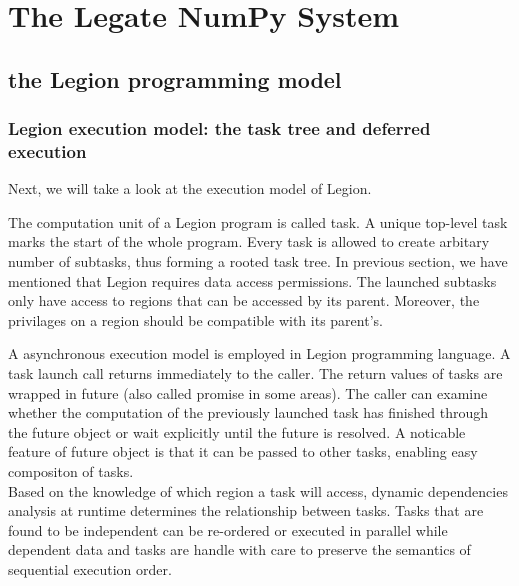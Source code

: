 \documentclass{article}
\newenvironment{newSec}[1]{
	\section{#1}
	\lhead{#1}
}{ \newpage }
\newenvironment{newSubsec}[1]{
	\subsection{#1}
}{}
\begin{document}
\begin{newSec}{The Legate NumPy System}
\begin{newSubsec}{the Legion programming model}
		\subsubsection{Legion execution model: the task tree and deferred execution}
		Next, we will take a look at the execution model of Legion.\par
		The computation unit of a Legion program is called task.
		A unique top-level task marks the start of the whole program.
		Every task is allowed to create arbitary number of subtasks, thus forming a rooted task tree.
		In previous section, we have mentioned that Legion requires data access permissions.
		The launched subtasks only have access to regions that can be accessed by its parent.
		Moreover, the privilages on a region should be compatible with its parent's.\par
		A asynchronous execution model is employed in Legion programming language.
		A task launch call returns immediately to the caller.
		The return values of tasks are wrapped in future (also called promise in some areas).
		The caller can examine whether the computation of the previously launched task has finished through the future object or wait explicitly until the future is resolved.
		A noticable feature of future object is that it can be passed to other tasks, enabling easy compositon of tasks.\\
		Based on the knowledge of which region a task will access, dynamic dependencies analysis at runtime determines the relationship between tasks.
		Tasks that are found to be independent can be re-ordered or executed in parallel while dependent data and tasks are handle with care to preserve the semantics of sequential execution order.
	\end{newSubsec}


\end{newSec}
\end{document}
